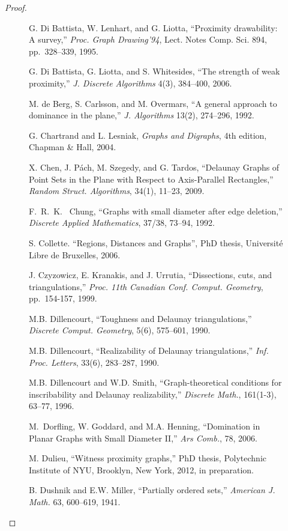 \documentclass{llncs}
\begin{document}
\begin{proof}
\begin{figure}
\begin{thebibliography}{99}
 G. Di Battista, W. Lenhart, and G. Liotta, ``Proximity
  drawability: A survey,'' \emph{Proc. Graph Drawing'94}, Lect. Notes
  Comp. Sci. 894, pp.~328--339, 1995.

  G. Di Battista, G. Liotta, and S. Whitesides,
``The strength of weak proximity,''
\emph{J. Discrete Algorithms} 4(3), 384--400, 2006.

  M. de Berg, S. Carlsson, and M. Overmars,
``A general approach to dominance in the plane,''
\emph{J. Algorithms} 13(2), 274--296, 1992.

 G. Chartrand and L. Lesniak,
\emph{Graphs and Digraphs}, 4th edition, Chapman \& Hall, 2004.

 X. Chen, J. P\'ach, M. Szegedy, and G. Tardos,
``Delaunay Graphs of Point Sets in the Plane with Respect to Axis-Parallel Rectangles,''
\emph{Random Struct. Algorithms},
34(1), 11--23, 2009.


 F.~R.~K.~ Chung,
``Graphs with small diameter after edge deletion,''
\emph{Discrete Applied Mathematics},
37/38, 73--94, 1992.


 S. Collette. ``Regions, Distances and Graphs'', PhD thesis, Universit\'{e} Libre de Bruxelles, 2006.

  J. Czyzowicz, E. Kranakis, and J. Urrutia,
``Dissections, cuts, and triangulations,''
\emph{Proc. 11th Canadian Conf. Comput. Geometry},
pp.~154-157, 1999.

 M.B. Dillencourt,
``Toughness and Delaunay triangulations,''
\emph{Discrete Comput. Geometry}, 5(6), 575--601, 1990.

 M.B. Dillencourt,
``Realizability of Delaunay triangulations,''
\emph{Inf. Proc. Letters}, 33(6), 283--287, 1990.

 M.B. Dillencourt and W.D. Smith,
``Graph-theoretical conditions for inscribability and Delaunay
realizability,''
\emph{Discrete Math.}, 161(1-3), 63--77, 1996.

 M.~Dorfling, W. Goddard, and M.A. Henning,
``Domination in Planar Graphs with Small Diameter II,''
\emph{Ars Comb.},
78, 2006.

 M. Dulieu, ``Witness proximity graphs,'' PhD thesis, Polytechnic Institute of
  NYU, Brooklyn, New York, 2012, in preparation.

  B. Dushnik and E.W. Miller,
``Partially ordered sets,''
\emph{American J. Math.} 63, 600--619, 1941.


\end{thebibliography}
\end{figure}
\end{proof}
\end{document}
